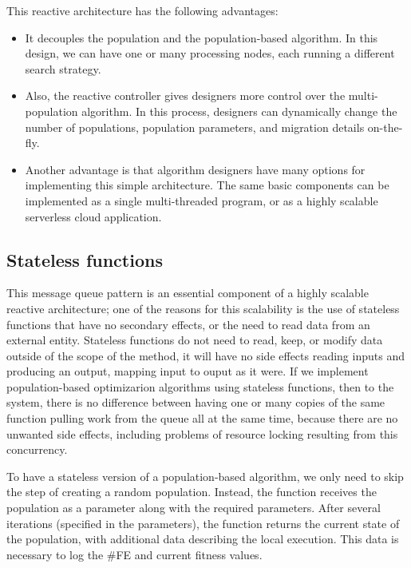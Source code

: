 This reactive architecture has the following advantages:
\begin{itemize}

\item It decouples the population and the population-based algorithm. In this
design, we can have one or many processing nodes, each running a different
search strategy.

\item Also, the reactive controller gives designers more control over the
multi-population algorithm. In this process, designers can dynamically change
the number of populations, population parameters, and migration details
on-the-fly.

\item Another advantage is that algorithm designers have many options for
implementing this simple architecture. The same basic components can be
implemented as a single multi-threaded program, or as a highly scalable
serverless cloud application.
\end{itemize}

\subsection{Stateless functions} 
\label{functions} 

This message queue pattern is an essential component of a highly scalable
reactive architecture; one of the reasons for this scalability is the use of
stateless functions that have no secondary effects, or the need to read data
from an external entity. Stateless functions do not need to read, keep, or
modify data outside of the scope of the method, it will have no side
effects reading inputs and producing an output, mapping input to ouput
as it were. If we implement population-based
optimizarion algorithms using stateless functions, then to the system, there is
no difference between having one or many copies of the same function pulling
work from the queue all at the same time, because there are no unwanted side
effects, including problems of resource locking resulting from this
concurrency. %

To have a stateless version of a population-based algorithm, we only need to
skip the step of creating a random population. Instead, the function receives
the population as a parameter along with the required parameters. After several
iterations (specified in the parameters), the function returns the current state
of the population, with additional data describing the local execution. This
data is necessary to log the \#FE and current fitness values.



